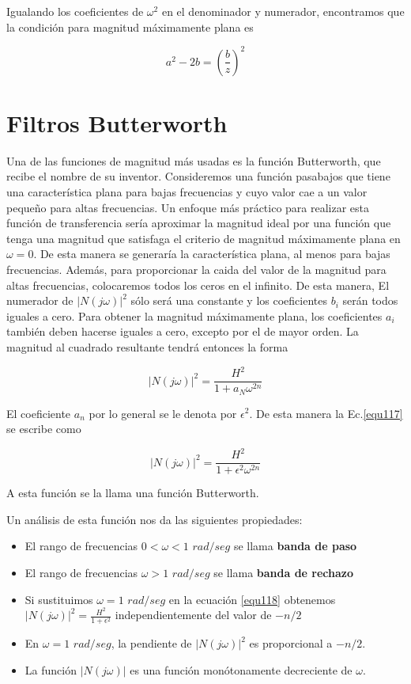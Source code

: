 \documentclass[12pt]{book}
\theoremstyle{definition}
\theoremstyle{remark}
\theoremstyle{plain}
\begin{document}
Igualando los coeficientes de $\omega^2$ en el denominador y numerador, encontramos que la condición para magnitud máximamente plana es

\begin{equation*}
a^2-2 b =(\frac{b}{z})^2
\end{equation*}

\section{Filtros Butterworth}

Una de las funciones de magnitud más usadas es la función Butterworth, que recibe el nombre de su inventor. Consideremos una función pasabajos que tiene una característica plana para bajas frecuencias y cuyo valor cae a un valor pequeño para altas frecuencias. Un enfoque más práctico para realizar esta función de transferencia sería aproximar la magnitud ideal por una función que tenga una magnitud que satisfaga el criterio de magnitud máximamente plana en $\omega=0$. De esta manera se generaría la característica plana, al menos para bajas frecuencias. Además, para proporcionar la caida del valor de la magnitud para altas frecuencias, colocaremos todos los ceros en el infinito. De esta manera, El numerador de  $|N(j\omega)|^2$ sólo será una constante y los coeficientes $b_i$ serán todos iguales a cero. Para obtener la magnitud máximamente plana, los coeficientes $a_i$ también deben hacerse iguales a cero, excepto por el de mayor orden. La magnitud al cuadrado resultante tendrá entonces la forma

\begin{equation}
|N(j\omega)|^ 2 = \frac{H^2}{1+a_N \omega ^ {2 n}}
\label{equ117}
\end{equation}

El coeficiente $a_n$ por lo general se le denota por $\epsilon ^ 2$. De esta manera la Ec.\ref{equ117} se escribe como

\begin{equation}
|N(j\omega)|^ 2 = \frac{H^2}{1+\epsilon ^2 \omega ^ {2 n}}
\label{equ118}
\end{equation}

A esta función se la llama una función Butterworth.

Un análisis de esta función nos da las siguientes propiedades:

\begin{itemize}
\item El rango de frecuencias $0<\omega<1$ $rad/seg$ se llama \textbf{banda de paso}
\item El rango de frecuencias $\omega >1$ $rad/seg$ se llama \textbf{banda de rechazo}
\item Si sustituimos $\omega=1$ $rad/seg$ en la ecuaci\'{o}n \ref{equ118} obtenemos $|N(j\omega)|^ 2= \frac{H^2}{1+\epsilon ^2}$ independientemente del valor de $-n/2$
\item En $\omega = 1$ $rad/seg$, la pendiente de $|N(j\omega)|^2$ es proporcional a $-n/2$.
\item La función $|N(j\omega)|$ es una función monótonamente decreciente de $\omega$.
\end{itemize}
\end{document}
